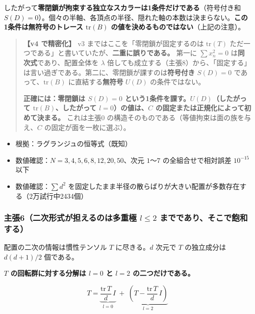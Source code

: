 \documentclass[
  10pt,
]{ltjsarticle}
\providecommand{\tightlist}{%
  \setlength{\itemsep}{0pt}\setlength{\parskip}{0pt}}
\begin{document}
したがって\textbf{零閉鎖が拘束する独立なスカラーは1条件だけである}（符号付き和
\(S(D)=0\)）。個々の半軸、各頂点の半径、隠れた軸の本数は決まらない。\textbf{この1条件は無符号のトレース
\(\mathrm{tr}(B)\) の値を決めるものではない}（上記の注意）。

\begin{quote}
\textbf{【v4 で精密化】} v3 まではここを「零閉鎖が固定するのは
\(\mathrm{tr}(T)\)
ただ一つである」と書いていたが、\textbf{二重に誤りである。} 第一に
\(\sum x_n^2 = 0\) は\textbf{同次式}であり、配置全体を \(\lambda\)
倍しても成立する（主張8）から、「固定する」は言い過ぎである。第二に、零閉鎖が課すのは\textbf{符号付き}
\(S(D)=0\) であって、\(\mathrm{tr}(B)\) に直結する\textbf{無符号}
\(U(D)\) の条件ではない。

\textbf{正確には：零閉鎖は \(S(D)=0\)
という1条件を課す。\(U(D)\)（したがって \(\mathrm{tr}(B)\)、したがって
\(l=0\)）の値は、\(C\) の固定または正規化によって初めて決まる。}
これは主張0 の構造そのものである（等値拘束は面の族を与え、\(C\)
の固定が面を一枚に選ぶ）。
\end{quote}

\begin{itemize}
\tightlist
\item
  根拠：ラグランジュの恒等式（既知）
\item
  数値確認：\(N = 3,4,5,6,8,12,20,50\)、次元 \(1\)〜\(7\)
  の全組合せで相対誤差 \(10^{-15}\) 以下
\item
  数値確認：\(\sum d^2\)
  を固定したまま半径の散らばりが大きい配置が多数存在する（2万試行中2434個）
\end{itemize}

\subsubsection{\texorpdfstring{主張6（二次形式が担えるのは多重極
\(l \le 2\)
までであり、そこで飽和する）}{主張6（二次形式が担えるのは多重極 l \textbackslash le 2 までであり、そこで飽和する）}}\label{ux4e3bux5f356ux4e8cux6b21ux5f62ux5f0fux304cux62c5ux3048ux308bux306eux306fux591aux91cdux6975-l-le-2-ux307eux3067ux3067ux3042ux308aux305dux3053ux3067ux98fdux548cux3059ux308b}

配置の二次の情報は慣性テンソル \(T\) に尽きる。\(d\) 次元で \(T\)
の独立成分は \(d(d+1)/2\) 個である。

\textbf{\(T\) の回転群に対する分解は \(l=0\) と \(l=2\)
の二つだけである。}

\[T = \underbrace{\frac{\mathrm{tr}\,T}{d}\,I}_{l=0} \;+\; \underbrace{\left(T - \frac{\mathrm{tr}\,T}{d}\,I\right)}_{l=2}\]
\end{document}
